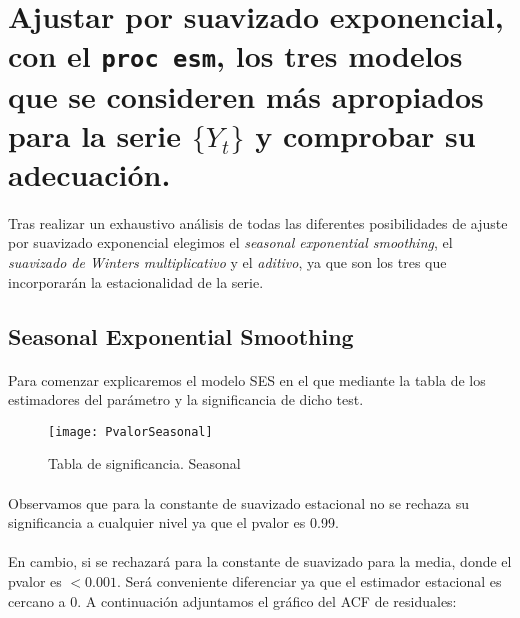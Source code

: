 \documentclass[a4paper, spanish]{article}
\begin{document}
  \section{Ajustar por suavizado exponencial, con el \texttt{proc esm}, los tres modelos que se consideren más apropiados para la serie $\{Y_t\}$ y comprobar su adecuación.}
  \label{sec:b}

    \paragraph{}
    Tras realizar un exhaustivo análisis de todas las diferentes posibilidades de ajuste por suavizado exponencial elegimos el \textit{seasonal exponential smoothing}, el \textit{suavizado de Winters multiplicativo} y el \textit{aditivo}, ya que son los tres que incorporarán la estacionalidad de la serie.\\

    \subsection{Seasonal Exponential Smoothing}

      \paragraph{}
      Para comenzar explicaremos el modelo SES en el que mediante la tabla de los estimadores del parámetro y la significancia de dicho test.

      \begin{figure}[h]
        \centering
        \texttt{[image: PvalorSeasonal]}
        \caption{Tabla de significancia. Seasonal}
        \label{}
      \end{figure}

      \paragraph{}
      Observamos que para la constante de suavizado estacional no se rechaza su significancia a cualquier nivel ya que el pvalor es 0.99.

      \paragraph{}
      En cambio, si se rechazará para la constante de suavizado para la media, donde el pvalor es $<0.001$. Será conveniente diferenciar ya que el estimador estacional es cercano a 0. A continuación adjuntamos el gráfico del ACF de residuales:
\end{document}
